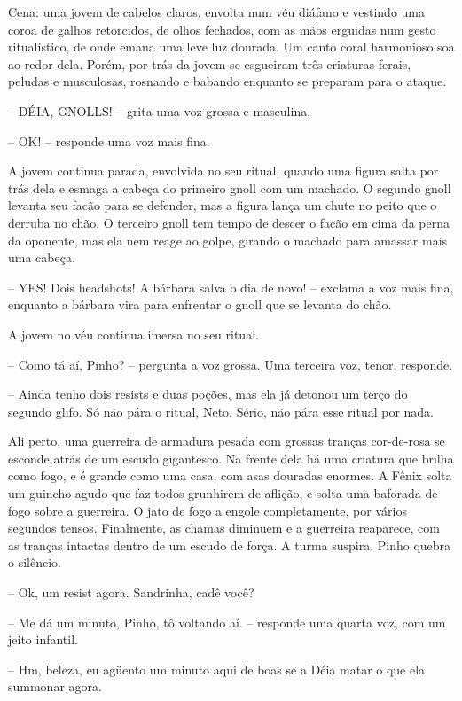

Cena: uma jovem de cabelos claros, envolta num véu diáfano e vestindo uma coroa de galhos retorcidos,
de olhos fechados, com as mãos erguidas num gesto ritualístico, de onde emana uma leve luz dourada.
Um canto coral harmonioso soa ao redor dela. Porém, por trás da jovem se esgueiram três criaturas
ferais, peludas e musculosas, rosnando e babando enquanto se preparam para o ataque.

-- DÉIA, GNOLLS! -- grita uma voz grossa e masculina.

-- OK! -- responde uma voz mais fina.

A jovem continua parada, envolvida no seu ritual, quando uma figura salta por trás dela e esmaga a cabeça do primeiro gnoll
com um machado. O segundo gnoll levanta seu facão para se defender, mas a figura lança um chute no peito que o derruba no chão.
O terceiro gnoll tem tempo de descer o facão em cima da perna da oponente, mas ela nem reage ao golpe, girando o machado para
amassar mais uma cabeça. 

-- YES! Dois headshots! A bárbara salva o dia de novo! -- exclama a voz mais fina, enquanto a bárbara vira para enfrentar o gnoll que se levanta do chão.

A jovem no véu continua imersa no seu ritual.

-- Como tá aí, Pinho? -- pergunta a voz grossa. Uma terceira voz, tenor, responde.

-- Ainda tenho dois resists e duas poções, mas ela já detonou um terço do segundo glifo. 
Só não pára o ritual, Neto. Sério, não pára esse ritual por nada.

Ali perto, uma guerreira de armadura pesada com grossas tranças cor-de-rosa se esconde atrás de um escudo gigantesco. 
Na frente dela há uma criatura que brilha como fogo, e é grande como uma casa, com asas douradas enormes.
A Fênix solta um guincho agudo que faz todos grunhirem de aflição, e solta uma baforada de fogo sobre a guerreira.
O jato de fogo a engole completamente, por vários segundos tensos. Finalmente, as chamas diminuem e a guerreira reaparece,
com as tranças intactas dentro de um escudo de força. A turma suspira. Pinho quebra o silêncio.

-- Ok, um resist agora. Sandrinha, cadê você?

-- Me dá um minuto, Pinho, tô voltando aí. -- responde uma quarta voz, com um jeito infantil.

-- Hm, beleza, eu agüento um minuto aqui de boas se a Déia matar o que ela summonar agora.

